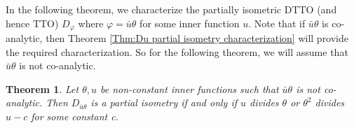\documentclass[12pt]{amsart}
\theoremstyle{definition}
\theoremstyle{plain}
\newtheorem{thm}{Theorem}[section]
\theoremstyle{definition}
\numberwithin{equation}{section}
\let\phi=\varphi
\begin{document}
	
	
	
	
In the following theorem, we characterize the partially isometric DTTO (and hence TTO) $D_\phi$ where $\phi=\bar{u}\theta$ for some inner function $u$. Note that if $\bar{u}\theta$ is co-analytic, then Theorem \ref{Thm:Du partial isometry characterization} will provide the required characterization. So for the following theorem, we will assume that $\bar{u}\theta$ is not co-analytic.
	
	
	
\begin{thm}
Let $\theta, u$ be non-constant inner functions such that $\bar{u}\theta$ is not co-analytic. Then $D_{\bar{u} \theta}$ is a partial isometry if and only if $u$ divides $\theta$ or $\theta^2$ divides $u-c$ for some constant c. 
\end{thm}
	
\end{document}
